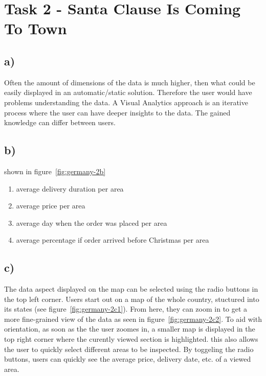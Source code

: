 \documentclass[a4paper]{article}
\begin{document}
\section*{Task 2 - Santa Clause Is Coming To Town}

\subsection*{a)} Often the amount of dimensions of the data is much higher, then what could be easily displayed in an automatic/static solution. Therefore the user would have problems understanding the data. A Visual Analytics approach is an iterative process where the user can have deeper insights to the data. The gained knowledge can differ between users.
\subsection*{b)}

shown in figure~\ref{fig:germany-2b}


\begin{enumerate}
	\item average delivery duration per area
	\item average price per area
	\item average day when the order was placed per area
	\item average percentage if order arrived before Christmas per area
\end{enumerate}


\subsection*{c)} The data aspect displayed on the map can be selected using the radio buttons in the top left corner. Users start out on a map of the whole country, stuctured into its states (see figure~\ref{fig:germany-2c1}). From here, they can zoom in to get a more fine-grained view of the data as seen in figure~\ref{fig:germany-2c2}. To aid with orientation, as soon as the the user zoomes in, a smaller map is displayed in the top right corner where the curently viewed section is highlighted. this also allows the user to quickly select different areas to be inspected. By toggeling the radio buttons, users can quickly see the average price, delivery date, etc. of a viewed area.
\end{document}
